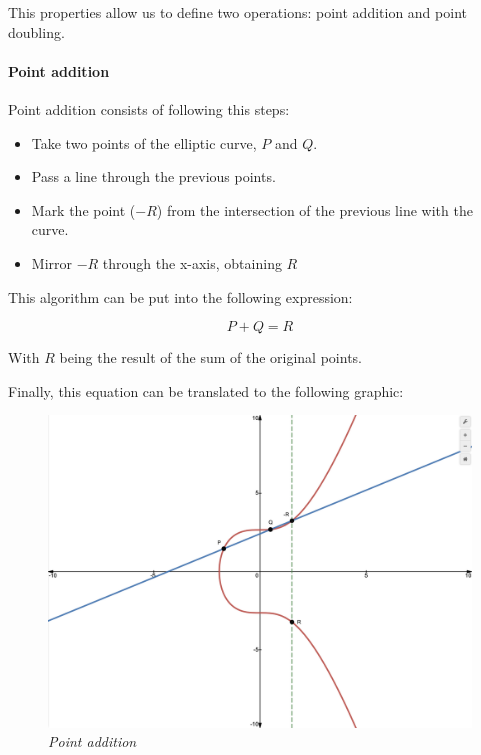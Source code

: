 \documentclass{article}
\newcommand\tab[1][1cm]{\hspace*{#1}}
\begin{document}
This properties allow us to define two operations: point addition and point doubling.

\paragraph{Point addition}

\tab Point addition consists of following this steps:

\begin{itemize}
    \item Take two points of the elliptic curve, \(P\) and \(Q\).
    \item Pass a line through the previous points.
    \item Mark the point (\(-R\)) from the intersection of the previous line with the curve.
    \item Mirror \(-R\) through the x-axis, obtaining \(R\)
\end{itemize}

This algorithm can be put into the following expression:

\[P + Q = R\]

With \(R\) being the result of the sum of the original points.

Finally, this equation can be translated to the following graphic:

\vspace{5mm} %

\begin{figure}[H]
    \begin{center}
        \includegraphics[width=0.6 \textwidth]{images/point_addition.png}
        \caption{\textit{Point addition}}
    \end{center}
\end{figure}
\end{document}
